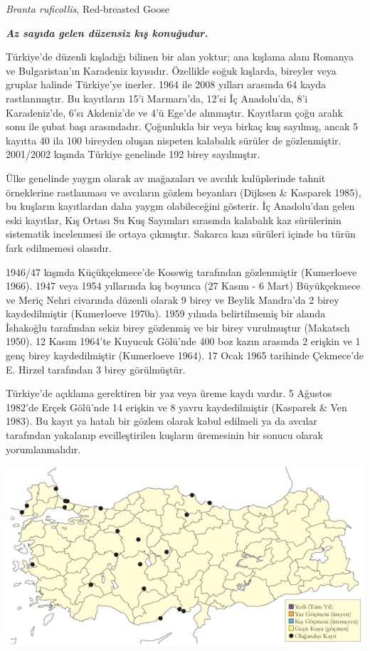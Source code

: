 \documentclass[
  letterpaper,
  DIV=11,
  numbers=noendperiod]{scrreprt}
\begin{document}
\emph{Branta ruficollis}, Red-breasted Goose

\textbf{\emph{Az sayıda gelen düzensiz kış konuğudur.}}

Türkiye'de düzenli kışladığı bilinen bir alan yoktur; ana kışlama alanı
Romanya ve Bulgaristan'ın Karadeniz kıyısıdır. Özellikle soğuk kışlarda,
bireyler veya gruplar halinde Türkiye'ye inerler. 1964 ile 2008 yılları
arasında 64 kayda rastlanmıştır. Bu kayıtların 15'i Marmara'da, 12'si İç
Anadolu'da, 8'i Karadeniz'de, 6'sı Akdeniz'de ve 4'ü Ege'de alınmıştır.
Kayıtların çoğu aralık sonu ile şubat başı arasındadır. Çoğunlukla bir
veya birkaç kuş sayılmış, ancak 5 kayıtta 40 ila 100 bireyden oluşan
nispeten kalabalık sürüler de gözlenmiştir. 2001/2002 kışında Türkiye
genelinde 192 birey sayılmıştır.

Ülke genelinde yaygın olarak av mağazaları ve avcılık kulüplerinde
tahnit örneklerine rastlanması ve avcıların gözlem beyanları (Dijksen \&
Kasparek 1985), bu kuşların kayıtlardan daha yaygın olabileceğini
gösterir. İç Anadolu'dan gelen eski kayıtlar, Kış Ortası Su Kuş
Sayımları sırasında kalabalık kaz sürülerinin sistematik incelenmesi ile
ortaya çıkmıştır. Sakarca kazı sürüleri içinde bu türün fark edilmemesi
olasıdır.

1946/47 kışında Küçükçekmece'de Kosswig tarafından gözlenmiştir
(Kumerloeve 1966). 1947 veya 1954 yıllarında kış boyunca (27 Kasım - 6
Mart) Büyükçekmece ve Meriç Nehri civarında düzenli olarak 9 birey ve
Beylik Mandra'da 2 birey kaydedilmiştir (Kumerloeve 1970a). 1959 yılında
belirtilmemiş bir alanda İshakoğlu tarafından sekiz birey gözlenmiş ve
bir birey vurulmuştur (Makatsch 1950). 12 Kasım 1964'te Kuyucuk Gölü'nde
400 boz kazın arasında 2 erişkin ve 1 genç birey kaydedilmiştir
(Kumerloeve 1964). 17 Ocak 1965 tarihinde Çekmece'de E. Hirzel
tarafından 3 birey görülmüştür.

Türkiye'de açıklama gerektiren bir yaz veya üreme kaydı vardır. 5
Ağustos 1982'de Erçek Gölü'nde 14 erişkin ve 8 yavru kaydedilmiştir
(Kasparek \& Ven 1983). Bu kayıt ya hatalı bir gözlem olarak kabul
edilmeli ya da avcılar tarafından yakalanıp evcilleştirilen kuşların
üremesinin bir sonucu olarak yorumlanmalıdır.

\includegraphics{images/harita_Page_007.png}
\end{document}
